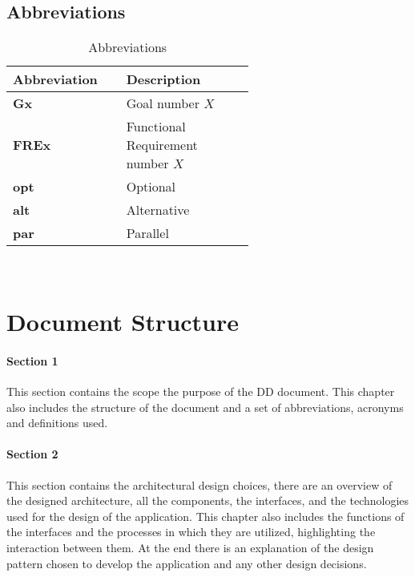\subsection{Abbreviations} %
\label{subsec:abbreviations}
\begin{table}[H]
\centering 
    \begin{tabular}{| p{0.2\linewidth} | p{0.4\linewidth} |}
    \hline
    \rowcolor{bluepoli!40}
     \textbf{Abbreviation} & \textbf{Description} \T\B \\
    \hline \hline
    \textbf{Gx} & Goal number $X$\T\B\\
    \hline
    \textbf{FREx} & Functional Requirement number $X$\T\B\\
    \hline
    \textbf{opt} & Optional \T\B\\
    \hline
    \textbf{alt} & Alternative  \T\B\\
    \hline       
    \textbf{par} & Parallel \T\B\\
    \hline   
    \end{tabular}
    \\[10pt]
    \caption{Abbreviations}
\end{table}
\newpage
\section{Document Structure}
\label{sec:documentStructure}
\paragraph{Section 1}
This section contains the scope the purpose of the DD
document. This chapter also includes the structure of the document and a set of abbreviations, acronyms and definitions used.
\paragraph{Section 2}
This section contains the architectural design choices, there are an overview of the designed architecture, all the components,
the interfaces, and the technologies used for the design of the application. This chapter also includes the functions of the interfaces and the processes in which they are utilized, highlighting the interaction between them. At the end there is an explanation of the design pattern chosen to develop the application and any other design decisions.
